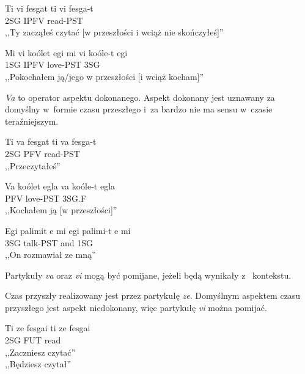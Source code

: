 \begin{spacing}{1.1}
\begin{exe}
	\ex
	\trans Ti vi fesgat
	\gll  ti vi fesga-t\\
	  2SG IPFV read-PST \\
	\glt  ,,Ty zacząłeś czytać [w przeszłości i wciąż nie skończyłeś]''
\end{exe}

\begin{exe}
	\ex
	\trans Mi vi koólet egi
	\gll  mi vi koóle-t egi\\
	  1SG IPFV love-PST 3SG \\
	\glt  ,,Pokochałem ją/jego w przeszłości [i wciąż kocham]''
\end{exe}

\emph{Va} to operator aspektu dokonanego. Aspekt dokonany jest uznawany za
domyślny w~formie czasu przeszłego i~za bardzo nie ma sensu w~czasie
teraźniejszym.

\begin{exe}
	\ex
	\trans Ti va fesgat
	\gll  ti va fesga-t\\
	  2SG PFV read-PST \\
	\glt  ,,Przeczytałeś''
\end{exe}

\begin{exe}
	\ex
	\trans Va koólet egla
	\gll  va koóle-t egla\\
	  PFV love-PST 3SG.F \\
	\glt  ,,Kochałem ją [w przeszłości]''
\end{exe}

\begin{exe}
	\ex
	\trans Egi palimit e mi
	\gll  egi palimi-t e mi\\
	  3SG talk-PST and 1SG \\
	\glt  ,,On rozmawiał ze mną''
\end{exe}

Partykuły \emph{va} oraz \emph{vi} mogą być pomijane, jeżeli będą wynikały z~
kontekstu.

Czas przyszły realizowany jest przez partykułę \emph{ze}. Domyślnym aspektem
czasu przyszłego jest aspekt niedokonany, więc partykułę \emph{vi} można
pomijać.

\begin{exe}
	\ex
	\trans Ti ze fesgai
	\gll  ti ze fesgai\\
	  2SG FUT read \\
	\glt  ,,Zaczniesz czytać'' \\ ,,Będziesz czytał''
\end{exe}


\end{spacing}
